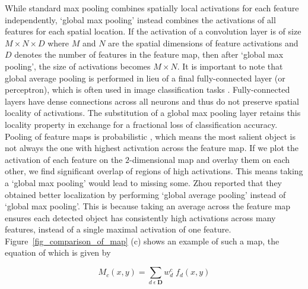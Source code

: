 While standard max pooling combines spatially local activations for each feature independently, `global max pooling' instead combines the activations of all features for each spatial location.  
If the activation of a convolution layer is of size $ M \times N \times D $ where $M$ and $N$ are the spatial dimensions of feature activations and $D$ denotes the number of features in the feature map, then after `global max pooling', the size of activations becomes $M \times N$.
It is important to note that global average pooling is performed in lieu of a final fully-connected layer (or perceptron), which is often used in image classification tasks \cite{xxx_simonyan2014very}.
Fully-connected layers have dense connections across all neurons and thus do not preserve spatial locality of activations.
The substitution of a global max pooling layer retains this locality property in exchange for a fractional loss of classification accuracy\cite{xxx_oquab2015object}.
Pooling of feature maps is probabilistic \cite{xxx_li2015beyond}, which means the most salient object is not always the one with highest activation across the feature map. 
If we plot the activation of each feature on the $2$-dimensional map and overlay them on each other, we find significant overlap of regions of high activations.
This means taking a `global max pooling' would lead to missing some. 
Zhou \cite{xxx_zhou2015learning} reported that they obtained better localization by performing `global average pooling' instead of `global max pooling'. 
This is because taking an average across the feature map ensures each detected object has consistently high activations across many features, instead of a single maximal activation of one feature.
Figure~\ref{fig_comparison_of_map} (c) shows an example of such a map, the equation of which is given by

\begin{equation}
    M_c(x,y) = \sum_{d \; \epsilon \; \mathbf{D}} w^{c}_{d} \; f_d(x,y)
    \label{eqn_gap}
\end{equation}

